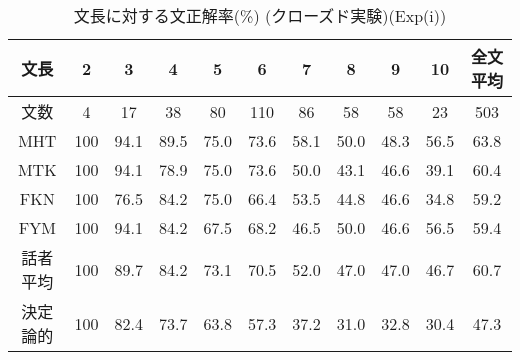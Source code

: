 \begin{table}
\begin{center}
\caption{文長に対する文正解率(\%) (クローズド実験)(Exp(i))}
\label{res:9}
\begin{tabular}{|c|c|c|c|c|c|c|c|c|c||c|}
\hline
文長		&2&3&4&5&6&7&8&9&10&全文平均 \\
\hline
\hline
文数		&4&17&38&80&110&86&58&58&23& 503\\
\hline
MHT		&100&94.1&89.5&75.0&73.6&58.1&50.0&48.3&56.5&63.8\\
MTK		&100&94.1&78.9&75.0&73.6&50.0&43.1&46.6&39.1&60.4\\
FKN		&100&76.5&84.2&75.0&66.4&53.5&44.8&46.6&34.8&59.2\\
FYM		&100&94.1&84.2&67.5&68.2&46.5&50.0&46.6&56.5&59.4\\
話者平均            &100&89.7&84.2&73.1&70.5&52.0&47.0&47.0&46.7&60.7\\
\hline
決定論的	&100&82.4&73.7&63.8&57.3&37.2&31.0&32.8&30.4&47.3\\
\hline
\end{tabular}
\end{center}
\end{table}

